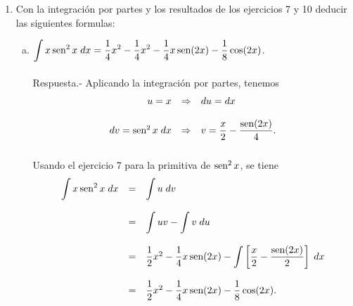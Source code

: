 \begin{enumerate}[\bfseries 1.]
\begin{enumerate}[(a)]
	\end{enumerate}

    \item Con la integración por partes y los resultados de los ejercicios 7 y 10 deducir las siguientes formulas:

	\begin{enumerate}[(a)]

	    \item $\displaystyle\int x\mathop{\mbox{\normalfont sen}}\nolimits^2 x\; dx = \dfrac{1}{4}x^2-\dfrac{1}{4}x^2-\dfrac{1}{4}x\mathop{\mbox{\normalfont sen}}\nolimits(2x)-\dfrac{1}{8}\cos (2x)$.\\\\
		Respuesta.-\; Aplicando la integración por partes, tenemos
		$$
		\begin{array}{rcl}
		    u=x&\Rightarrow&du=dx\\\\
		    dv=\mathop{\mbox{\normalfont sen}}\nolimits^2 x\; dx &\Rightarrow&v=\dfrac{x}{2}-\dfrac{\mathop{\mbox{\normalfont sen}}\nolimits(2x)}{4}.\\\\
		\end{array}
		$$
		Usando el ejercicio 7 para la primitiva de $\mathop{\mbox{\normalfont sen}}\nolimits^2 x$, se tiene
		$$
		\begin{array}{rcl}
		    \displaystyle\int x\mathop{\mbox{\normalfont sen}}\nolimits^2 x\; dx&=&\displaystyle\int u\; dv\\\\
				    &=&\displaystyle\int uv - \int v\; du\\\\
				    &=&\dfrac{1}{2}x^2-\dfrac{1}{4}x\mathop{\mbox{\normalfont sen}}\nolimits(2x)-\displaystyle\int\left[\dfrac{x}{2}-\dfrac{\mathop{\mbox{\normalfont sen}}\nolimits(2x)}{2}\right]\; dx\\\\
				    &=&\dfrac{1}{2}x^2-\dfrac{1}{4}x\mathop{\mbox{\normalfont sen}}\nolimits(2x)-\dfrac{1}{8}\cos(2x).
		\end{array}
		$$
		\vspace{.5cm}


\end{enumerate}
\end{enumerate}
